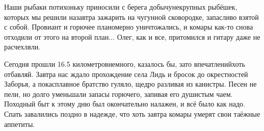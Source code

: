 Наши рыбаки потихоньку приносили с берега добычу\mdash некрупных рыбёшек, которых мы решили назавтра зажарить на чугунной сковородке, запасливо взятой с собой. Провиант и горючее планомерно уничтожались, и комары как-то снова отходили от этого на второй план$\ldots$ Олег, как и все, притомился и гитару даже не расчехляли.

Сегодня прошли 16.5 километров\mdash немного, казалось бы, зато впечатлений\mdash хоть отбавляй. Завтра нас ждало прохождение села Лидь и бросок до окрестностей Заборья, а пока\mdash сплавное братство гуляло, щедро разливая из канистры. Песен не пели, но долго уменьшали запасы горючего, запивая его душистым чаем. Походный быт к этому дню был окончательно налажен, и всё было как надо. Спать завалились поздно в надежде, что хоть завтра комары умерят свои таёжные аппетиты.

\begin{center}
\end{center}
